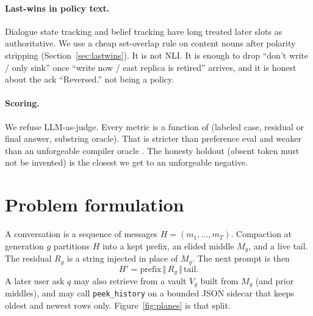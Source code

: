 \documentclass[11pt]{article}
\begin{document}
\paragraph{Last-wins in policy text.}
Dialogue state tracking and belief tracking have long treated later
slots as authoritative. We use a cheap set-overlap rule on content
nouns after polarity stripping (Section~\ref{sec:lastwins}). It is not
NLI. It is enough to drop ``don't write / only sink'' once ``write now /
east replica is retired'' arrives, and it is honest about the ack
``Reversed.'' not being a policy.

\paragraph{Scoring.}
We refuse LLM-as-judge. Every metric is a function of (labeled case,
residual or final answer, substring oracle). That is stricter than
preference eval and weaker than an unforgeable compiler oracle
\cite{palmer2026state}. The honesty holdout (absent token must not be
invented) is the closest we get to an unforgeable negative.

\section{Problem formulation}
\label{sec:problem}

A conversation is a sequence of messages $H = (m_1,\ldots,m_T)$.
Compaction at generation $g$ partitions $H$ into a kept prefix, an
elided middle $M_g$, and a live tail. The residual $R_g$ is a string
injected in place of $M_g$. The next prompt is then
\[
H' = \mathrm{prefix} \,\Vert\, R_g \,\Vert\, \mathrm{tail}.
\]
A later user ask $q$ may also retrieve from a vault $V_g$ built from
$M_g$ (and prior middles), and may call \texttt{peek\_history} on a
bounded JSON sidecar that keeps oldest and newest rows only.
Figure~\ref{fig:planes} is that split.
\end{document}
